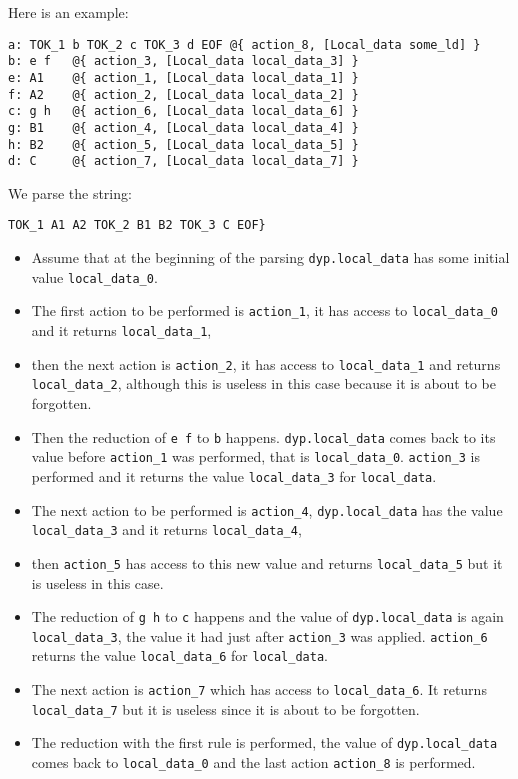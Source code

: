 \documentclass[12pt]{article}
\begin{document}
{Here is an example:
\begin{verbatim}
a: TOK_1 b TOK_2 c TOK_3 d EOF @{ action_8, [Local_data some_ld] }
b: e f   @{ action_3, [Local_data local_data_3] }
e: A1    @{ action_1, [Local_data local_data_1] }
f: A2    @{ action_2, [Local_data local_data_2] }
c: g h   @{ action_6, [Local_data local_data_6] }
g: B1    @{ action_4, [Local_data local_data_4] }
h: B2    @{ action_5, [Local_data local_data_5] }
d: C     @{ action_7, [Local_data local_data_7] }
\end{verbatim}
We parse the string:
\begin{verbatim}
TOK_1 A1 A2 TOK_2 B1 B2 TOK_3 C EOF}
\end{verbatim}
\begin{itemize}
\item Assume that at the beginning of the parsing 
\verb|dyp.local_data| has some initial value \verb|local_data_0|.
\item The first action to be performed is \verb|action_1|, it has access to \verb|local_data_0| and it returns \verb|local_data_1|,
\item then the next action is \verb|action_2|, it has access to \verb|local_data_1| and returns \verb|local_data_2|, although this is useless in this case because it is about to be forgotten.
\item Then the reduction of \verb|e f| to \verb|b| happens. \verb|dyp.local_data| comes back to its value before \verb|action_1| was performed, that is \verb|local_data_0|. \verb|action_3| is performed and it returns the value \verb|local_data_3| for \verb|local_data|.
\item The next action to be performed is \verb|action_4|, \verb|dyp.local_data| has the value \verb|local_data_3| and it returns \verb|local_data_4|,
\item then \verb|action_5| has access to this new value and returns \verb|local_data_5| but it is useless in this case.
\item The reduction of \verb|g h| to \verb|c| happens and the value of \verb|dyp.local_data| is again \verb|local_data_3|, the value it had just after \verb|action_3| was applied. \verb|action_6| returns the value \verb|local_data_6| for \verb|local_data|.
\item The next action is \verb|action_7| which has access to \verb|local_data_6|. It returns \verb|local_data_7| but it is useless since it is about to be forgotten.
\item The reduction with the first rule is performed, the value of \verb|dyp.local_data| comes back to \verb|local_data_0| and the last action \verb|action_8| is performed.
\end{itemize}

}
\end{document}

